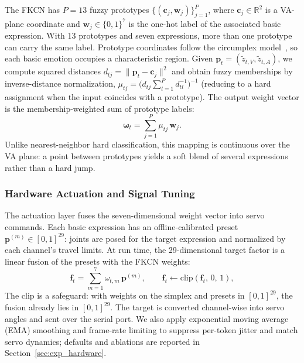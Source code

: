 \documentclass[letterpaper, 10 pt, conference]{ieeeconf}
\begin{document}
The FKCN has $P = 13$ fuzzy prototypes $\{(\mathbf{c}_j, \mathbf{w}_j)\}_{j=1}^{P}$, where $\mathbf{c}_j \in \mathbb{R}^2$ is a VA-plane coordinate and $\mathbf{w}_j\in\{0,1\}^{7}$ is the one-hot label of the associated basic expression. With 13 prototypes and seven expressions, more than one prototype can carry the same label. Prototype coordinates follow the circumplex model~\cite{russell1980circumplex}, so each basic emotion occupies a characteristic region.
Given $\mathbf{p}_t = (\tilde{z}_{t,V}, \tilde{z}_{t,A})$, we compute squared distances $d_{tj} = \|\mathbf{p}_t - \mathbf{c}_j\|^2$ and obtain fuzzy memberships by inverse-distance normalization,
$\mu_{tj} = \bigl(d_{tj}\sum_{l=1}^{P} d_{tl}^{-1}\bigr)^{-1}$ (reducing to a hard assignment when the input coincides with a prototype).
The output weight vector is the membership-weighted sum of prototype labels:
\begin{equation}
    \boldsymbol{\omega}_t = \sum_{j=1}^{P} \mu_{tj}\, \mathbf{w}_j .
    \label{eq:fkcn}
\end{equation}
Unlike nearest-neighbor hard classification, this mapping is continuous over the VA plane: a point between prototypes yields a soft blend of several expressions rather than a hard jump.

\subsubsection{Hardware Actuation and Signal Tuning}
The actuation layer fuses the seven-dimensional weight vector into servo commands.
Each basic expression has an offline-calibrated preset $\mathbf{p}^{(m)} \in [0,1]^{29}$: joints are posed for the target expression and normalized by each channel's travel limits.
At run time, the 29-dimensional target factor is a linear fusion of the presets with the FKCN weights:
\begin{equation}
    \mathbf{f}_t = \sum_{m=1}^{7} \omega_{t,m}\, \mathbf{p}^{(m)}, \qquad \mathbf{f}_t \leftarrow \mathrm{clip}(\mathbf{f}_t,\, 0,\, 1),
    \label{eq:fusion}
\end{equation}
The clip is a safeguard: with weights on the simplex and presets in $[0,1]^{29}$, the fusion already lies in $[0,1]^{29}$. The target is converted channel-wise into servo angles and sent over the serial port. We also apply exponential moving average (EMA) smoothing and frame-rate limiting to suppress per-token jitter and match servo dynamics; defaults and ablations are reported in Section~\ref{sec:exp_hardware}.
\end{document}
